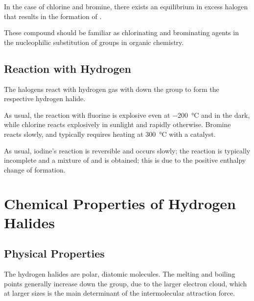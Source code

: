 			In the case of chlorine and bromine, there exists an equilibrium in excess halogen that results in the formation of .


			These compound should be familiar as chlorinating and brominating agents in the nucleophilic substitution of  groups in
			organic chemistry.




		\subsection{Reaction with Hydrogen}

			The halogens react with hydrogen gas with  down the group to form the respective hydrogen halide.


			As usual, the reaction with fluorine is explosive even at \SI{-200}{\celsius} and in the dark, while chlorine reacts explosively
			in sunlight and rapidly otherwise. Bromine reacts slowly, and typically requires heating at \SI{300}{\celsius} with a 
			catalyst.

			As usual, iodine's reaction is reversible and occurs slowly; the reaction is typically incomplete and a mixture of  and 
			is obtained; this is due to the positive enthalpy change of formation.






	\pagebreak
	\section{Chemical Properties of Hydrogen Halides}

		\subsection{Physical Properties}

			The hydrogen halides are polar, diatomic molecules. The melting and boiling points generally increase down the group, due to
			the larger electron cloud, which at larger sizes is the main determinant of the intermolecular attraction force.

